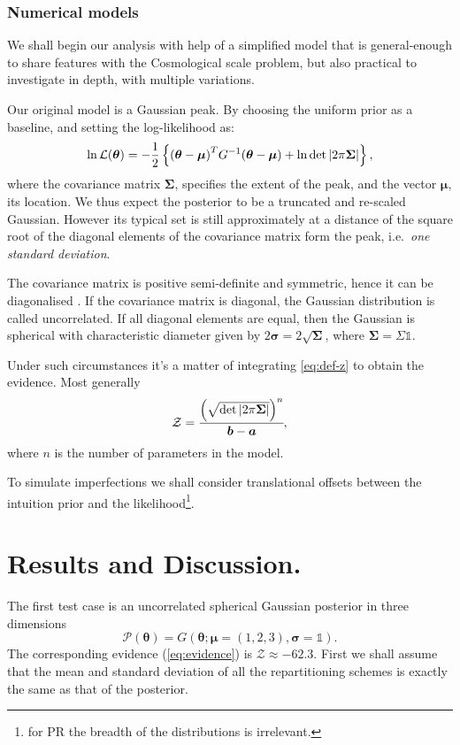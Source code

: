\documentclass[usenatbib]{mnras}
\begin{document}
\subsubsection{Numerical models}

We shall begin our analysis with help of a simplified model that is
general-enough to share features with the Cosmological scale problem,
but also practical to investigate in depth, with multiple variations.

Our original model is a Gaussian peak. By choosing the uniform prior
as a baseline, and setting the log-likelihood as:
\begin{equation*}
  \ln {\cal L}(\bm{\theta}) = - \dfrac{1}{2} \left\{{(\bm{\theta} - \bm{\mu})}^{T}G^{-1}(\bm{\theta}-\bm{\mu})  + \ln \det \left| 2\mathrm{\pi} \bm{\Sigma}\right| \right\},
\end{equation*}
where the covariance matrix \(\bm{\Sigma}\), specifies the extent of
the peak, and the vector \(\bm{\mu}\), its location. We thus expect
the posterior to be a truncated and re-scaled Gaussian. However its
typical set is still approximately at a distance of the square root of
the diagonal elements of the covariance matrix form the peak,
i.e.~\emph{one standard deviation}.

The covariance matrix is positive semi-definite and symmetric, hence
it can be diagonalised \citep{taboga2017lectures}. If the covariance
matrix is diagonal, the Gaussian distribution is called
uncorrelated. If all diagonal elements are equal, then the Gaussian is
spherical with characteristic diameter given by
\(2\bm{\sigma} = 2\sqrt{\bm{\Sigma}}\), where \(\bm{\Sigma} = \Sigma \mathds{1}\).


Under such circumstances it's a matter of integrating \cref{eq:def-z}
to obtain the evidence. Most generally
\begin{equation}\label{eq:evidence}
   {\cal Z} = \cfrac{{\left( \sqrt{ \det \left| 2\mathrm{\pi} \bm{\Sigma} \right|} \right)}^{n}}{\bm{b}-\bm{a}}, 
\end{equation}
where \(n\) is the number of parameters in the model.

To simulate imperfections we shall consider translational offsets
between the intuition prior and the likelihood\footnote{for PR the
  breadth of the distributions is irrelevant.}.


\section{Results and Discussion.}\label{sec:org50493c6}
The first test case is an uncorrelated spherical Gaussian posterior
in three dimensions \[\mathcal{P}(\bm{\theta}) = G(\bm{\theta}; \bm{\mu} =
  (1,2,3),\bm{\sigma} = \mathds{1}).\] The corresponding evidence
(\cref{eq:evidence}) is \(\mathcal{Z}\approx-62.3\). First we shall
assume that the mean and standard deviation of all the
repartitioning schemes is exactly the same as that of the
posterior.
\end{document}
